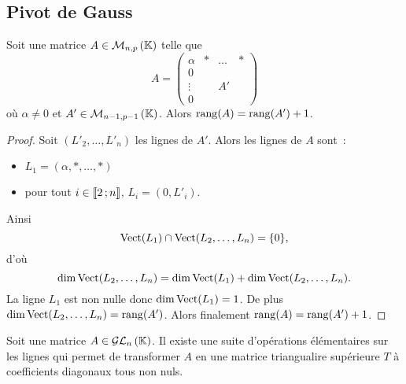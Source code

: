 \subsection{Pivot de Gauss}
%
\begin{lemme}
  Soit une matrice \(A \in \mathcal{M}_{n,p}\left(\mathbb{K}\right)\) telle que
  \begin{equation}
    A =
    \begin{pmatrix}
      \alpha & * & \ldots & * \\
      0 & & & \\
      \vdots & & A' & \\
      0 & & & 
    \end{pmatrix}
  \end{equation}
  où \(\alpha \neq 0\) et \(A'\in \mathcal{M}_{n-1,p-1}\left(\mathbb{K}\right)\). Alors \(\operatorname{rang}(A)=\operatorname{rang}(A')+1\).
\end{lemme}
\begin{proof}
  Soit \((L'_2, \ldots, L'_n)\) les lignes de \(A'\). Alors les lignes de \(A\) sont~:
  \begin{itemize}
  \item \(L_1=(\alpha, *, \ldots, *)\)
  \item pour tout \(i \in \mathopen{\llbracket}2\mathclose{}\mathpunct{};n\mathclose{\rrbracket}\), \(L_i=(0,L'_i)\).
  \end{itemize}
  Ainsi
  \begin{equation}
    \operatorname{Vect}(L_1) \cap \operatorname{Vect}(L_2, \ldots, L_n)=\{0\},
  \end{equation}
  d'où
  \begin{equation}
    \dim \operatorname{Vect}(L_2, \ldots, L_n) = \dim \operatorname{Vect}(L_1) + \dim \operatorname{Vect}(L_2, \ldots, L_n).
  \end{equation}
  La ligne \(L_1\) est non nulle donc \(\dim \operatorname{Vect}(L_1)=1\). De plus \(\dim \operatorname{Vect}(L_2, \ldots, L_n) = \operatorname{rang}(A')\). Alors finalement \(\operatorname{rang}(A)=\operatorname{rang}(A')+1\).
\end{proof}
%
\begin{prop}
  Soit une matrice \(A \in \mathcal{GL}_{n}\left(\mathbb{K}\right)\). Il existe une suite d'opérations élémentaires sur les lignes qui permet de transformer \(A\) en une matrice triangualire supérieure \(T\) à coefficients diagonaux tous non nuls.
\end{prop}
